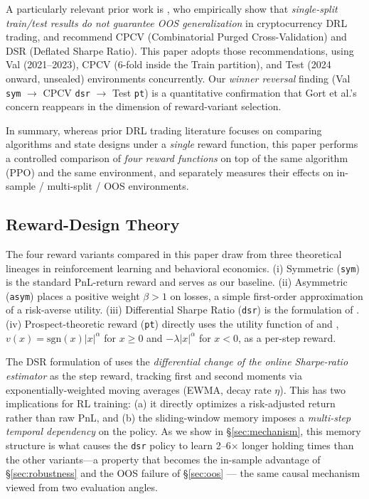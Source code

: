 \documentclass[11pt, a4paper]{article}
\begin{document}
A particularly relevant prior work is \citet{gort2022backtest}, who
empirically show that \emph{single-split train/test results do not guarantee
OOS generalization} in cryptocurrency DRL trading, and recommend CPCV
(Combinatorial Purged Cross-Validation) and DSR (Deflated Sharpe Ratio). This
paper adopts those recommendations, using Val (2021--2023), CPCV (6-fold inside
the Train partition), and Test (2024 onward, unsealed) environments concurrently.
Our \emph{winner reversal} finding (Val \texttt{sym} $\to$ CPCV \texttt{dsr}
$\to$ Test \texttt{pt}) is a quantitative confirmation that Gort et al.'s
concern reappears in the dimension of reward-variant selection.

In summary, whereas prior DRL trading literature focuses
on comparing algorithms and state designs under a \emph{single} reward function,
this paper performs a controlled comparison of \emph{four reward functions} on
top of the same algorithm (PPO) and the same environment, and separately
measures their effects on in-sample / multi-split / OOS environments.

\subsection{Reward-Design Theory}
\label{sec:related_reward}

The four reward variants compared in this paper draw from three theoretical
lineages in reinforcement learning and behavioral economics. (i) Symmetric
(\texttt{sym}) is the standard PnL-return reward and serves as our baseline.
(ii) Asymmetric (\texttt{asym}) places a positive weight $\beta>1$ on losses,
a simple first-order approximation of a risk-averse utility. (iii) Differential
Sharpe Ratio (\texttt{dsr}) is the formulation of \citet{moody2001dsr}.
(iv) Prospect-theoretic reward (\texttt{pt}) directly uses the utility function
of \citet{kahneman1979prospect} and \citet{tversky1992cumulative},
$v(x) = \mathrm{sgn}(x) |x|^\alpha$ for $x \geq 0$ and $-\lambda |x|^\alpha$
for $x < 0$, as a per-step reward.

The DSR formulation of \citet{moody2001dsr} uses the \emph{differential change
of the online Sharpe-ratio estimator} as the step reward, tracking first and
second moments via exponentially-weighted moving averages (EWMA, decay rate
$\eta$). This has two implications for RL training: (a) it directly optimizes
a risk-adjusted return rather than raw PnL, and (b) the sliding-window memory
imposes a \emph{multi-step temporal dependency} on the policy. As we show in
\S\ref{sec:mechanism}, this memory structure is what causes the \texttt{dsr}
policy to learn 2--6$\times$ longer holding times than the other variants---a
property that becomes the in-sample advantage of \S\ref{sec:robustness} and
the OOS failure of \S\ref{sec:oos} — the same causal mechanism viewed
from two evaluation angles.
\end{document}
